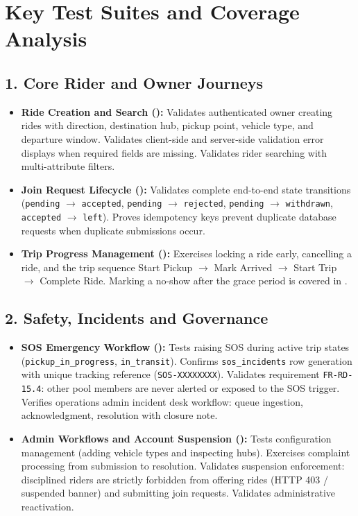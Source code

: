\documentclass[10pt]{article}
\begin{document}
\section{Key Test Suites and Coverage Analysis}

\subsection{1. Core Rider and Owner Journeys}
\begin{itemize}
  \item \textbf{Ride Creation and Search ():} Validates authenticated owner creating rides with direction, destination hub, pickup point, vehicle type, and departure window. Validates client-side and server-side validation error displays when required fields are missing. Validates rider searching with multi-attribute filters.
  \item \textbf{Join Request Lifecycle ():} Validates complete end-to-end state transitions (\texttt{pending} $\rightarrow$ \texttt{accepted}, \texttt{pending} $\rightarrow$ \texttt{rejected}, \texttt{pending} $\rightarrow$ \texttt{withdrawn}, \texttt{accepted} $\rightarrow$ \texttt{left}). Proves idempotency keys prevent duplicate database requests when duplicate submissions occur.
  \item \textbf{Trip Progress Management ():} Exercises locking a ride early, cancelling a ride, and the trip sequence Start Pickup $\rightarrow$ Mark Arrived $\rightarrow$ Start Trip $\rightarrow$ Complete Ride. Marking a no-show after the grace period is covered in .
\end{itemize}

\subsection{2. Safety, Incidents and Governance}
\begin{itemize}
  \item \textbf{SOS Emergency Workflow ():} Tests raising SOS during active trip states (\texttt{pickup\_in\_progress}, \texttt{in\_transit}). Confirms \texttt{sos\_incidents} row generation with unique tracking reference (\texttt{SOS-XXXXXXXX}). Validates requirement \texttt{FR-RD-15.4}: other pool members are never alerted or exposed to the SOS trigger. Verifies operations admin incident desk workflow: queue ingestion, acknowledgment, resolution with closure note.
  \item \textbf{Admin Workflows and Account Suspension ():} Tests configuration management (adding vehicle types and inspecting hubs). Exercises complaint processing from submission to resolution. Validates suspension enforcement: disciplined riders are strictly forbidden from offering rides (HTTP 403 / suspended banner) and submitting join requests. Validates administrative reactivation.
\end{itemize}
\end{document}
